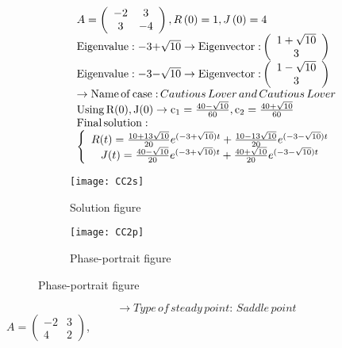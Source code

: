 \documentclass[a4paper]{article}
\begin{document}
\[\begin{array}{l}
A = \left( {\begin{array}{*{20}{c}}
{ - 2}&3\\
3&{ - 4}
\end{array}} \right),R\left( 0 \right) = 1,J\left( 0 \right) = 4\\
{\rm{Eigenvalue: - 3 + }}\sqrt {10}  \to {\rm{Eigenvector:}}\left( {\begin{array}{*{20}{c}}
{1 + \sqrt {10} }\\
3
\end{array}} \right)\\
{\rm{Eigenvalue: - 3 - }}\sqrt {10}  \to {\rm{Eigenvector:}}\left( {\begin{array}{*{20}{c}}
{1 - \sqrt {10} }\\
3
\end{array}} \right)\\
 \to {\rm{Name}}\,{\rm{of}}\,{\rm{case:}}\,Cautious\,Lover\,and\,Cautious\,Lover\\
{\rm{Using}}\,{\rm{R(0), J(0)}} \to {{\rm{c}}_1} = \frac{{40 - \sqrt {10} }}{{60}},{\rm{ }}{{\rm{c}}_2} = \frac{{40 + \sqrt {10} }}{{60}}\\
{\rm{Final}}\,{\rm{solution:}}\\
\left\{ {\begin{array}{*{20}{c}}
{R(t) = \frac{{10 + 13\sqrt {10} }}{{20}}{e^{({\rm{ - 3 + }}\sqrt {10} )t}} + \frac{{10 - 13\sqrt {10} }}{{20}}{e^{({\rm{ - 3 - }}\sqrt {10} )t}}}\\
{J(t) = \frac{{40 - \sqrt {10} }}{{20}}{e^{({\rm{ - 3 + }}\sqrt {10} )t}} + \frac{{40 + \sqrt {10} }}{{20}}{e^{({\rm{ - 3 - }}\sqrt {10} )t}}}
\end{array}} \right.
\end{array}\]
\begin{figure}[H]
\centering
\begin{subfigure}{.5\textwidth}
  \centering
  \texttt{[image: CC2s]}
  \caption*{Solution figure}
\end{subfigure}%
\begin{subfigure}{.5\textwidth}
  \centering
  \texttt{[image: CC2p]}
  \caption*{Phase-portrait figure}
\end{subfigure}
\end{figure}
\[  \to  Type\,of\,steady\,point:\,Saddle\,point\]
$A = \begin{pmatrix}
  -2 & 3\\
  4 & 2
\end{pmatrix}$, 
\end{document}

